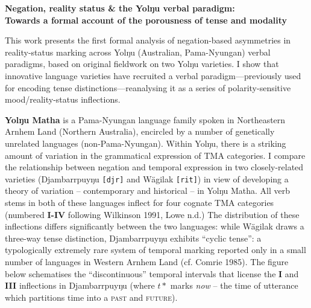 \documentclass[dvipsnames,12pt]{article}%
\begin{document}
	\begin{center}
		\textbf{{\large  Negation, reality status \& the Yolŋu verbal paradigm:}\\Towards a formal account of the porousness of tense and modality}\end{center}
	
	
	\vspace{0.1em}
\noindent	This work presents the first formal analysis of negation-based asymmetries in reality-status marking across Yolŋu (Australian, Pama-Nyungan) verbal paradigms, based on original fieldwork on two Yolŋu varieties. I show that innovative language varieties have recruited a verbal paradigm---previously used for encoding tense distinctions---reanalysing it as a series of polarity-sensitive mood/reality-status inflections.



\noindent\textbf{Yolŋu Matha }is a Pama-Nyungan language family spoken in Northeastern Arnhem Land (Northern Australia), encircled by a number of genetically unrelated languages (non-Pama-Nyungan). Within Yolŋu, there is a striking amount of variation in the grammatical expression of TMA categories. I compare the relationship between negation and temporal expression in two closely-related varieties (Djambarrpuyŋu \texttt{[djr]} and Wägilak \texttt{[rit]}) in view of developing a theory of variation -- contemporary and historical -- in Yolŋu Matha. All verb stems in both of these languages inflect for four cognate TMA categories (numbered \textbf{I-IV} following Wilkinson 1991, Lowe n.d.) The distribution of these inflections differs significantly between the two languages: while Wägilak draws a three-way tense distinction, Djambarrpuyŋu exhibits ``cyclic tense'': a typologically extremely rare system of temporal marking reported only in a small number of languages in Western Arnhem Land (cf. Comrie 1985). The figure below schematises the ``discontinuous'' temporal intervals that license the \textbf{I} and \textbf{III} inflections in Djambarrpuyŋu (where $ t* $ marks \textit{now} -- the time of utterance which partitions time into a \textsc{past} and \textsc{future}).
\end{document}
